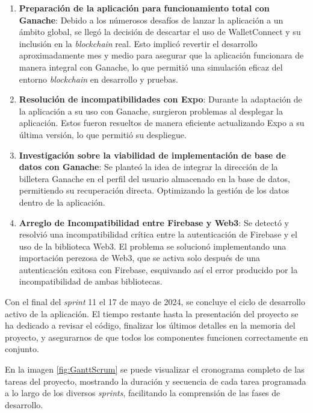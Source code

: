 \begin{enumerate}

\item \textbf{Preparación de la aplicación para funcionamiento total con Ganache}: Debido a los númerosos desafíos de lanzar la aplicación a un ámbito global, se llegó la decisión de descartar el uso de WalletConnect y su inclusión en la \textit{blockchain} real. Esto implicó revertir el desarrollo aproximadamente mes y medio para asegurar que la aplicación funcionara de manera integral con Ganache, lo que permitió una simulación eficaz del entorno \textit{blockchain} en desarrollo y pruebas.

\item \textbf{Resolución de incompatibilidades con Expo}: Durante la adaptación de la aplicación a su uso con Ganache, surgieron problemas al desplegar la aplicación. Estos fueron resueltos de manera eficiente actualizando Expo a su última versión, lo que permitió su despliegue.

\item \textbf{Investigación sobre la viabilidad de implementación de base de datos con Ganache}: Se planteó la idea de integrar la dirección de la billetera Ganache en el perfil del usuario almacenado en la base de datos, permitiendo su recuperación directa. Optimizando la gestión de los datos dentro de la aplicación.

\item \textbf{Arreglo de Incompatibilidad entre Firebase y Web3}: Se detectó y resolvió una incompatibilidad crítica entre la autenticación de Firebase y el uso de la biblioteca Web3. 
El problema se solucionó implementando una importación perezosa de Web3, que se activa solo después de una autenticación exitosa con Firebase, esquivando así el error producido por la incompatibilidad de ambas bibliotecas.

\end{enumerate}

Con el final del \textit{sprint} 11 el 17 de mayo de 2024, se concluye el ciclo de desarrollo activo de la aplicación. El tiempo restante hasta la presentación del proyecto se ha dedicado a revisar el código, finalizar los últimos detalles en la memoria del proyecto, y asegurarnos de que todos los componentes funcionen correctamente en conjunto.

En la imagen \ref{fig:GanttScrum} se puede visualizar el cronograma completo de las tareas del proyecto, mostrando la duración y secuencia de cada tarea programada a lo largo de los diversos \textit{sprints}, facilitando la comprensión de las fases de desarrollo.

